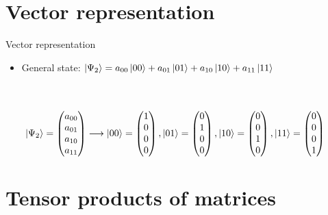 \documentclass[aspectratio=169,12pt]{beamer}
\begin{document}
\section{Vector representation}

\begin{frame}{Vector representation}
  \begin{itemize}
    \item General state: $\ket{\Psi_2} = a_{00}\ket{00}+a_{01}\ket{01}+a_{10}\ket{10}+a_{11}\ket{11}$
  \end{itemize}
  ~\\~\\
  $\qquad \ket{\Psi_2} = \begin{pmatrix} 
    a_{00} \\
    a_{01} \\
    a_{10} \\
    a_{11} \\
\end{pmatrix} \longrightarrow \ket{00} = \begin{pmatrix} 
    1\\
    0\\
    0\\
    0\\
\end{pmatrix} , \ket{01} = \begin{pmatrix} 
    0\\
    1\\
    0\\
    0\\
\end{pmatrix}, \ket{10} = \begin{pmatrix} 
    0\\
    0\\
    1\\
    0\\
\end{pmatrix} , \ket{11} = \begin{pmatrix} 
    0\\
    0\\
    0\\
    1\\
\end{pmatrix}  $
\end{frame}

\section{Tensor products of matrices}
\end{document}
